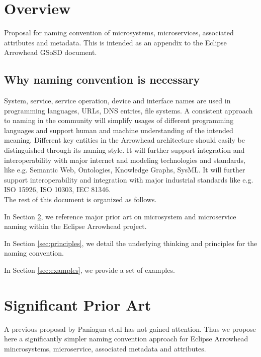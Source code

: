 \documentclass[a4paper]{arrowhead}
\begin{document}
\tableofcontents
\newpage

\section{Overview}
\label{sec:overview}
  Proposal for naming convention of microsystems, microservices, associated attributes and metadata. This is intended as an appendix to the Eclipse Arrowhead GSoSD document.

\subsection{Why naming convention is necessary}
System, service, service operation, device and interface names are used in
programming languages, URLs, DNS entries, file systems. A consistent
approach to naming in the community will simplify usages of different programming
languages and support human and machine understanding of the intended
meaning. Different key entities in the Arrowhead architecture should
easily be distinguished through its naming style.  
It will further support integration and interoperability with
major internet and modeling technologies and standards, like
e.g. Semantic Web, Ontologies, Knowledge Graphs, SysML. It will further support interoperability and
integration with major industrial standards like e.g. ISO 15926, ISO
10303, IEC 81346. \\


The rest of this document is organized as follows.

In Section \ref{sec:prior_art}, we reference major prior art on
microsystem and microservice naming within the Eclipse Arrowhead project. 

In Section \ref{sec:principles}, we detail the underlying thinking
and principles for the
naming convention.

In Section \ref{sec:examples}, we provide a set of examples.


\newpage

\section{Significant Prior Art}
\label{sec:prior_art}

A previous proposal by Paniagua et.al \cite{Paniagua_2019} has not
  gained attention. Thus we propose here a significantly simpler
  naming convention approach for Eclipse Arrowhead mincrosystems,
  microservice, associated metadata and attributes.
\end{document}
